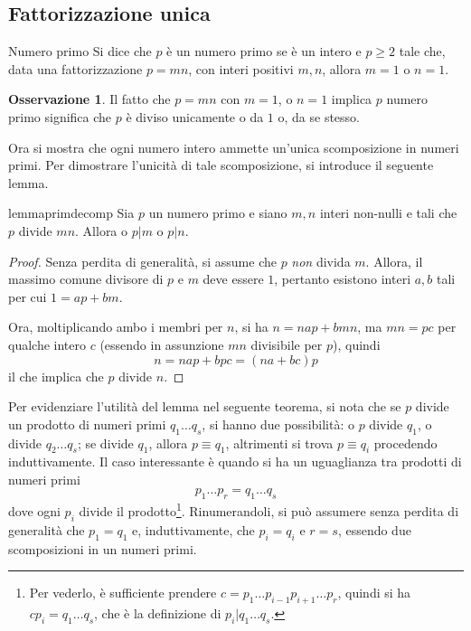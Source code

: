 \documentclass[11pt, a4paper]{scrartcl}
\theoremstyle{definition}
\numberwithin{esempio}{section}
\theoremstyle{definition}
\newtheorem{obs}{Osservazione}
\numberwithin{obs}{section}
\numberwithin{nota}{section}
\numberwithin{equation}{subsection}
\begin{document}
\subsection{Fattorizzazione unica}
\begin{definizione}
	{Numero primo}{}
	Si dice che $p$ \`e un numero primo se \`e un intero e $p\ge   2$ tale che, data una fattorizzazione $p = mn $, con interi positivi $m,n$, allora $m=1$ o $n=1$.
\end{definizione}
\begin{obs}
	Il fatto che $p=mn$ con $m=1$, o $n=1$ implica $p$ numero primo significa che $p$ \`e diviso unicamente o da $1$ o, da se stesso.
\end{obs}
\noindent Ora si mostra che ogni numero intero ammette un'unica scomposizione in numeri primi. 
Per dimostrare l'unicit\`a di tale scomposizione, si introduce il seguente lemma.
\begin{lemma}
	{}{lemmaprimdecomp}
	Sia $p$ un numero primo e siano $m,n$ interi non-nulli e tali che $p$ divide $mn$. Allora o $p|m$ o $p |n$.
	\begin{proof}
		Senza perdita di generalit\`a, si assume che $p$ \textit{non} divida $m$. 
		Allora, il massimo comune divisore di $p$ e $m$ deve essere $1$, pertanto esistono interi $a,b$ tali per cui $1 = ap + bm$.

		Ora, moltiplicando ambo i membri per $n$, si ha $n = nap + bmn$, ma $mn = pc$ per qualche intero $c$ (essendo in assunzione $mn$ divisibile per $p$), quindi
		\[
		n = nap + bpc = (na + bc) p
		\] 
		il che implica che $p$ divide $n$.
	\end{proof}
\end{lemma}
\noindent Per evidenziare l'utilit\`a del lemma nel seguente teorema, si nota che se $p$ divide un prodotto di numeri primi $q_1\ldots q_s$, si hanno due possibilit\`a: o $p$ divide $q_1$, o divide $q_2 \ldots q_s$; se divide $q_1$, allora $p \equiv q_1$, altrimenti si trova $p\equiv q_i$ procedendo induttivamente. 
Il caso interessante \`e quando si ha un uguaglianza tra prodotti di numeri primi 
\[
p_1 \ldots p_r = q_1\ldots q_s
\] 
dove ogni $p_i$ divide il prodotto\footnote{Per vederlo, \`e sufficiente prendere $c = p_1 \ldots p_{i-1} p_{i+1} \ldots p_r$, quindi si ha $c p_i = q_1 \ldots q_s$, che \`e la definizione di $p_i | q_1 \ldots q_s$.}. Rinumerandoli, si pu\`o assumere senza perdita di generalit\`a che $p_1 = q_1$ e, induttivamente, che $p_i = q_i$ e $r = s$, essendo due scomposizioni in un numeri primi.
\end{document}
